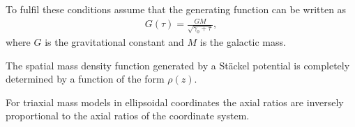     To fulfil these conditions assume that the generating function can be written as
    \begin{gather}
        G(\tau) = \frac{GM}{\sqrt{\gamma_0 + \tau}},
    \end{gather}
    where $G$ is the gravitational constant and $M$ is the galactic mass.

    \begin{theorem}[Kuzmin]
        The spatial mass density function generated by a St\"ackel potential is completely determined by a function of the form $\rho(z)$.
    \end{theorem}
    \begin{result}
        For triaxial mass models in ellipsoidal coordinates the axial ratios are inversely proportional to the axial ratios of the coordinate system.
    \end{result}